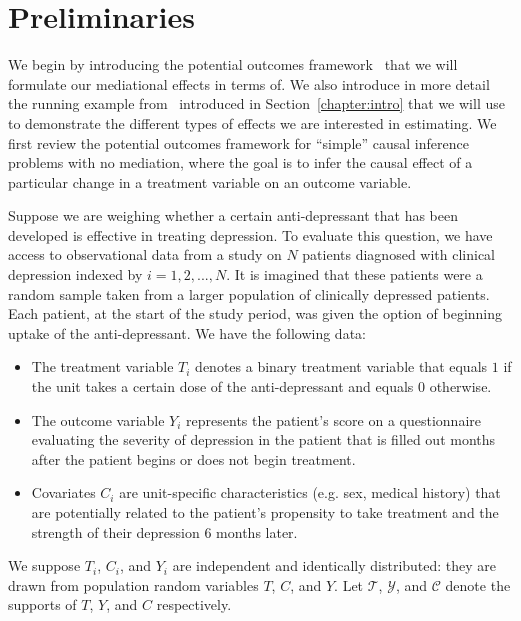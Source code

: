 \chapter{Preliminaries}\label{chapter:preliminaries}

We begin by introducing the potential outcomes framework~\citep{rubin1974} that we will formulate 
our mediational effects in terms of. We also introduce in more detail the running example 
from~\cite{morenobetancur2018} introduced in Section~\ref{chapter:intro} that we will use to 
demonstrate the different types of effects we are interested in estimating. We first review the 
potential outcomes framework for ``simple''
causal inference problems with no mediation, where the goal is to infer the causal 
effect of a particular change in a treatment variable on an outcome variable. 

Suppose we are weighing whether a certain anti-depressant that has been developed is effective in treating
depression. To evaluate this question, we have access to observational data from a study on $N$
patients diagnosed with clinical depression indexed by $i = 1, 2, ..., N$. It is imagined that
these patients were a random sample taken from a larger population of clinically depressed patients. Each patient,
at the start of the study period, was given the option of beginning uptake of the anti-depressant. 
We have the following data:
\begin{itemize}[noitemsep,topsep=0pt]
\item The treatment variable $T_{i}$ denotes a binary treatment variable that equals $1$ if the 
unit takes a certain dose of the anti-depressant and equals $0$ otherwise. 
\item The outcome variable $Y_{i}$ represents the patient's score on a questionnaire evaluating the severity 
of depression in the patient that is filled out months after the patient begins or does not begin treatment. 
\item Covariates $C_{i}$ are unit-specific characteristics (e.g. sex, medical history) that are potentially 
related to the patient's propensity to take treatment and the strength of their depression 6 months later. 
\end{itemize}

We suppose $T_{i}$, $C_{i}$, and $Y_{i}$ are independent and identically distributed: they are drawn from 
population random variables $T$, $C$, and $Y$. Let $\mathcal{T}$, $\mathcal{Y}$, and $\mathcal{C}$ 
denote the supports of $T$, $Y$, and $C$ respectively. 

